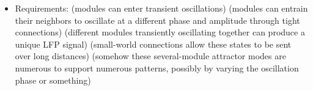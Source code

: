 \documentclass[a4paper, 12pt]{article}
\begin{document}
\begin{itemize}
\item Requirements: (modules can enter transient oscillations) (modules can entrain their neighbors to oscillate at a different phase and amplitude through tight connections) (different modules transiently oscillating together can produce a unique LFP signal) (small-world connections allow these states to be sent over long distances) (somehow these several-module attractor modes are numerous to support numerous patterns, possibly by varying the oscillation phase or something)
\end{itemize}



\end{document}
